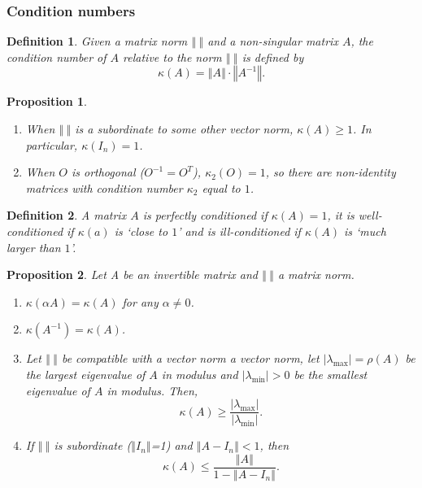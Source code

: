 \documentclass{article}
\newtheorem{definition}{Definition}
\newtheorem{proposition}{Proposition}
\begin{document}
\subsubsection{Condition numbers}
\begin{definition}
    Given a matrix norm $\left\Vert \ \right\Vert$ and a non-singular matrix $A$, the condition number of $A$ relative to the norm $\left\Vert \ \right\Vert$ is defined by
    \begin{equation}
        \kappa(A)=\left\Vert A \right\Vert\cdot\left\Vert A^{-1} \right\Vert.\nonumber
    \end{equation}
\end{definition}
\begin{proposition}
    \begin{enumerate}
        \item When $\left\Vert \ \right\Vert$ is a subordinate to some other vector norm, $\kappa(A)\geq1$. In particular, $\kappa(I_n)=1$.
        \item When $O$ is orthogonal ($O^{-1}=O^T$), $\kappa_2(O)=1$, so there are non-identity matrices with condition number $\kappa_2$ equal to $1$.
    \end{enumerate}
\end{proposition}
\begin{definition}
    A matrix $A$ is perfectly conditioned if $\kappa(A)=1$, it is well-conditioned if $\kappa(a)$ is `close to $1$' and is ill-conditioned if $\kappa(A)$ is `much larger than $1$'.
\end{definition}
\begin{proposition}
    Let A be an invertible matrix and $\left\Vert \ \right\Vert$ a matrix norm.
    \begin{enumerate}
        \item $\kappa(\alpha A)=\kappa(A)$ for any $\alpha\neq 0$.
        \item $\kappa(A^{-1})=\kappa(A)$.
        \item Let $\left\Vert \ \right\Vert$ be compatible with a vector norm a vector norm, let $\vert\lambda_{\max}\vert=\rho(A)$ be the largest eigenvalue of $A$ in modulus and $\vert \lambda_{\min}\vert>0$ be the smallest eigenvalue of $A$ in modulus. Then,
        \begin{equation}
            \kappa(A)\geq\frac{\vert\lambda_{\max}\vert}{\vert\lambda_{\min}\vert}. \nonumber
        \end{equation}
        \item If $\left\Vert \ \right\Vert$ is subordinate ($\left\Vert I_n \right\Vert$=1) and $\left\Vert A-I_n \right\Vert<1$, then
        \begin{equation}
            \kappa(A)\leq \frac{\left\Vert A \right\Vert}{1-\left\Vert A-I_n \right\Vert}.
        \end{equation}
    \end{enumerate}
\end{proposition}
\end{document}
